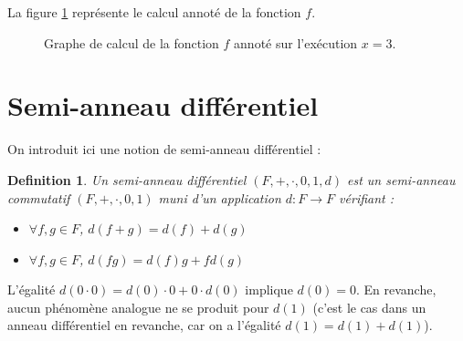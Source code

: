 \documentclass[11pt,a4paper]{article}
\newtheorem{definition}{Definition}
\begin{document}
		La figure \ref{fig:graphe_calc_annote_simplement} représente le calcul annoté de la fonction $f$.

	\begin{figure}[!h]
	\label{fig:graphe_calc_annote_simplement}
	\centering
	
	\caption{Graphe de calcul de la fonction $f$ annoté sur l'exécution $x=3$.}
	\end{figure}


\section{Semi-anneau différentiel}

On introduit ici une notion de semi-anneau différentiel :

\begin{definition}

	Un semi-anneau différentiel $(F,+,\cdot,0,1,d)$ est un semi-anneau commutatif $(F,+,\cdot,0,1)$ muni d'un application $d : F \to F$ vérifiant :
	\begin{itemize}
	
		\item $\forall f,g \in F$, $d(f+g)=d(f)+d(g)$
		
		\item $\forall f,g \in F$, $d(fg)=d(f)g+fd(g)$
			
	\end{itemize}

\end{definition}

L'égalité $d(0 \cdot 0) = d(0)\cdot 0+0\cdot d(0)$ implique $d(0)=0$. En revanche, aucun phénomène analogue ne se produit pour $d(1)$ (c'est le cas dans un anneau différentiel en revanche, car on a l'égalité $d(1) = d(1) + d(1)$).
\end{document}
